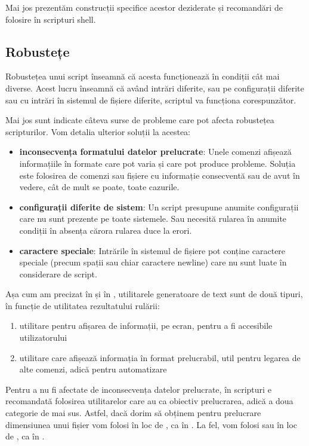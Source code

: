 Mai jos prezentăm construcții specifice acestor deziderate și recomandări de folosire în scripturi shell.

\subsection{Robustețe}
\label{sec:auto:script-advanced:robust}

Robustețea unui script înseamnă că acesta funcționează în condiții cât mai diverse.
Acest lucru înseamnă că având intrări diferite, sau pe configurații diferite sau cu intrări în sistemul de fișiere diferite, scriptul va funcționa corespunzător.

Mai jos sunt indicate câteva surse de probleme care pot afecta robustețea scripturilor.
Vom detalia ulterior soluții la acestea:

\begin{itemize}
  \item \textbf{inconsecvența formatului datelor prelucrate}:
    Unele comenzi afișează informațiile în formate care pot varia și care pot produce probleme.
    Soluția este folosirea de comenzi sau fișiere cu informație consecventă sau de avut în vedere, cât de mult se poate, toate cazurile.
  \item \textbf{configurații diferite de sistem}: Un script presupune anumite configurații care nu sunt prezente pe toate sistemele.
    Sau necesită rularea în anumite condiții în absența cărora rularea duce la erori.
  \item \textbf{caractere speciale}: Intrările în sistemul de fișiere pot conține caractere speciale (precum spații sau chiar caractere newline) care nu sunt luate în considerare de script.
\end{itemize}

Așa cum am precizat în  și în , utilitarele generatoare de text sunt de două tipuri, în funcție de utilitatea rezultatului rulării:

\begin{enumerate}
  \item utilitare pentru afișarea de informații, pe ecran, pentru a fi accesibile utilizatorului
  \item utilitare care afișează informația în format prelucrabil, util pentru legarea de alte comenzi, adică pentru automatizare
\end{enumerate}

Pentru a nu fi afectate de inconsecvența datelor prelucrate, în scripturi e recomandată folosirea utilitarelor care au ca obiectiv prelucrarea, adică a doua categorie de mai sus.
Astfel, dacă dorim să obținem pentru prelucrare dimensiunea unui fișier vom folosi  în loc de , ca în  .
La fel, vom folosi  sau  în loc de , ca în .

